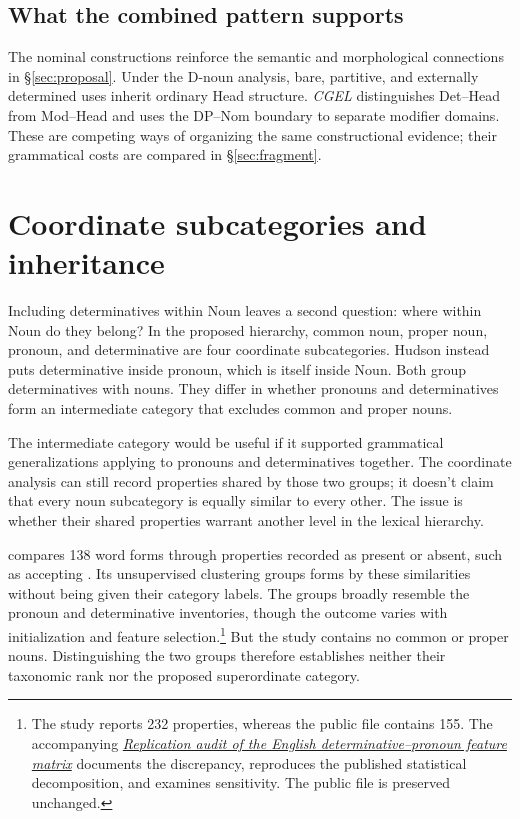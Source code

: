 \documentclass[12pt]{article}
\begin{document}
\subsection{What the combined pattern supports}\label{sec:cumulative}

The nominal constructions reinforce the semantic and morphological connections in §\ref{sec:proposal}. Under the D-noun analysis, bare, partitive, and externally determined uses inherit ordinary Head structure. \textit{CGEL} distinguishes Det--Head from Mod--Head and uses the DP--Nom boundary to separate modifier domains. These are competing ways of organizing the same constructional evidence; their grammatical costs are compared in §\ref{sec:fragment}.

\section{Coordinate subcategories and inheritance}\label{sec:inheritance}

Including determinatives within Noun leaves a second question: where within Noun do they belong? In the proposed hierarchy, common noun, proper noun, pronoun, and determinative are four coordinate subcategories. Hudson instead puts determinative inside pronoun, which is itself inside Noun. Both group determinatives with nouns. They differ in whether pronouns and determinatives form an intermediate category that excludes common and proper nouns.

The intermediate category would be useful if it supported grammatical generalizations applying to pronouns and determinatives together. The coordinate analysis can still record properties shared by those two groups; it doesn't claim that every noun subcategory is equally similar to every other. The issue is whether their shared properties warrant another level in the lexical hierarchy.

\textcite{reynolds2021} compares 138 word forms through properties recorded as present or absent, such as accepting . Its unsupervised clustering groups forms by these similarities without being given their category labels. The groups broadly resemble the pronoun and determinative inventories, though the outcome varies with initialization and feature selection.\footnote{The study reports 232 properties, whereas the public file contains 155. The accompanying \href{run:matrix-audit.pdf}{\textit{Replication audit of the English determinative--pronoun feature matrix}} documents the discrepancy, reproduces the published statistical decomposition, and examines sensitivity. The public file is preserved unchanged.} But the study contains no common or proper nouns. Distinguishing the two groups therefore establishes neither their taxonomic rank nor the proposed superordinate category.
\end{document}
